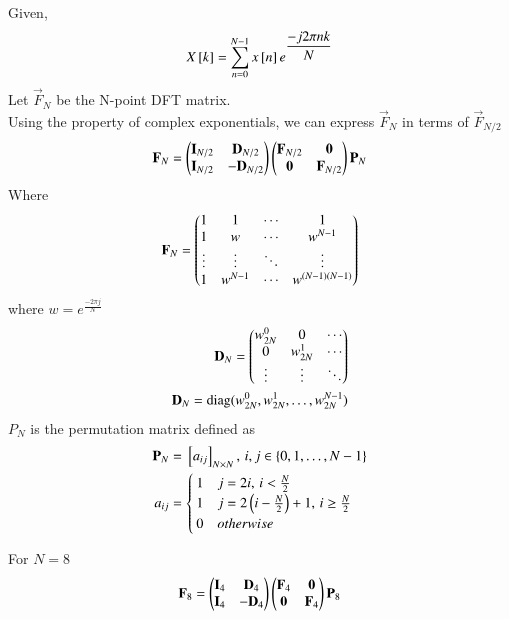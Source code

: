 \documentclass[journal,12pt,twocolumn]{IEEEtran}
\begin{document}
Given, $$X{}\left[k\right]= \sum_{n=0}^{N-1} x{}\left[n\right]e^{\dfrac{-j2\pi nk}{N}}$$
Let $\vec{F}_N$ be the N-point DFT matrix.\\
Using the property of complex exponentials, we can express $\vec{F}_N$ in terms of $\vec{F}_{N/2}$
\begin{align}
    \mathbf{F}_N=\begin{pmatrix}\mathbf{I}_{N/2} & \mathbf{D}_{N/2} \\ \mathbf{I}_{N/2} & -\mathbf{D}_{N/2}\end{pmatrix}\begin{pmatrix}\mathbf{F}_{N/2} & \mathbf{0} \\ \mathbf{0} & \mathbf{F}_{N/2}\end{pmatrix}\mathbf{P}_N
\end{align}
Where
\begin{align}
    \mathbf{F}_N=\begin{pmatrix}1 & 1 & \cdots & 1 \\ 1 & w & \cdots & w^{N-1} \\ \vdots & \vdots & \ddots & \vdots\\ 1 & w^{N-1} & \cdots & w^{(N-1)(N-1)}\end{pmatrix}  \label{3}
\end{align}
where $w=e^{\frac{-2\pi j}{N}}$
\begin{align}
\mathbf{D}_N=\begin{pmatrix}w_{2N}^0 & 0 & \cdots\\ 0 & w_{2N}^1 &  \cdots \\ \vdots & \vdots & \ddots \end{pmatrix}\\
\mathbf{D}_N=\text{diag}(w_{2N}^0,w_{2N}^1,\ldots,w_{2N}^{N-1})
\end{align}
$P_{N}$ is the permutation matrix defined as 
\begin{align}
    \mathbf{P}_N&={}\left[a_{ij}\right]_{N\times N},\, i,j\in\left\{0,1,\ldots,N-1\right\}\\
	a_{ij} &=
\begin{cases}
1 & j=2i,\, i<\frac{N}{2}\\
1 &  j=2\left(i-\frac{N}{2}\right)+1,\, i\geq \frac{N}{2}\\
0 & otherwise
\end{cases}
\label{eq:final_result}
\end{align}

For $N=8$
\begin{align}
    \mathbf{F}_8=\begin{pmatrix}\mathbf{I}_4 & \mathbf{D}_{4} \\ \mathbf{I}_{4} & -\mathbf{D}_{4}\end{pmatrix}\begin{pmatrix}\mathbf{F}_{4} & \mathbf{0} \\ \mathbf{0} & \mathbf{F}_{4}\end{pmatrix}\mathbf{P}_8
\end{align}
\end{document}

